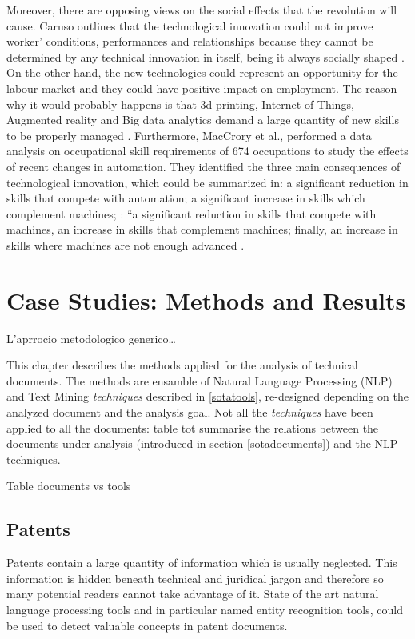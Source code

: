 \documentclass[]{book}
\begin{document}
Moreover, there are opposing views on the social effects that the
revolution will cause. Caruso outlines that the technological innovation
could not improve worker' conditions, performances and relationships
because they cannot be determined by any technical innovation in itself,
being it always socially shaped \citep{caruso2017digital}. On the other
hand, the new technologies could represent an opportunity for the labour
market and they could have positive impact on employment. The reason why
it would probably happens is that 3d printing, Internet of Things,
Augmented reality and Big data analytics demand a large quantity of new
skills to be properly managed \citep{freddi2017digitalisation}.
Furthermore, MacCrory et al., performed a data analysis on occupational
skill requirements of 674 occupations to study the effects of recent
changes in automation. They identified the three main consequences of
technological innovation, which could be summarized in: a significant
reduction in skills that compete with automation; a significant increase
in skills which complement machines; : ``a significant reduction in
skills that compete with machines, an increase in skills that complement
machines; finally, an increase in skills where machines are not enough
advanced \citep{maccrory2014racing}.

\chapter{Case Studies: Methods and Results}\label{methods}

L'aprrocio metodologico generico\ldots{}

This chapter describes the methods applied for the analysis of technical
documents. The methods are ensamble of Natural Language Processing (NLP)
and Text Mining \emph{techniques} described in \ref{sotatools},
re-designed depending on the analyzed document and the analysis goal.
Not all the \emph{techniques} have been applied to all the documents:
table tot summarise the relations between the documents under analysis
(introduced in section \ref{sotadocuments}) and the NLP techniques.

Table documents vs tools

\section{Patents}\label{patents}

Patents contain a large quantity of information which is usually
neglected. This information is hidden beneath technical and juridical
jargon and therefore so many potential readers cannot take advantage of
it. State of the art natural language processing tools and in particular
named entity recognition tools, could be used to detect valuable
concepts in patent documents.
\end{document}
